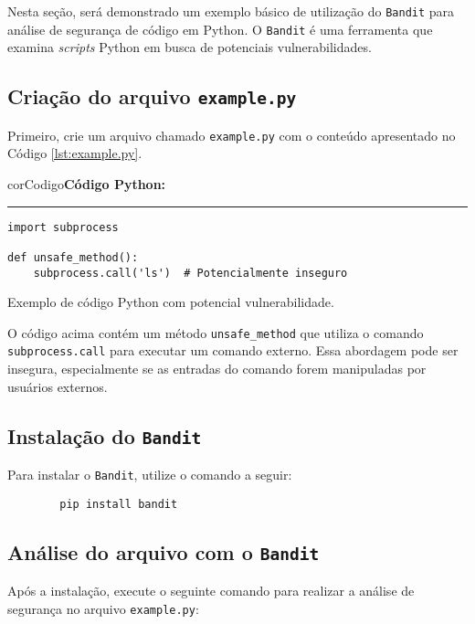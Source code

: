 Nesta seção, será demonstrado um exemplo básico de utilização do \texttt{Bandit} para análise de segurança de código em Python. O \texttt{Bandit} é uma ferramenta que examina \textit{scripts} Python em busca de potenciais vulnerabilidades.

\subsection{Criação do arquivo \texttt{example.py}}

Primeiro, crie um arquivo chamado \texttt{example.py} com o conteúdo apresentado no Código \ref{lst:example.py}.

\begin{listing}[!ht]
    \begin{myboxCode}{corCodigo}{\textbf{Código Python: }}\vspace{3mm}
    \hrule
    \begin{verbatim}
import subprocess

def unsafe_method():
    subprocess.call('ls')  # Potencialmente inseguro
\end{verbatim}
\end{myboxCode}
\caption{Exemplo de código Python com potencial vulnerabilidade.}
\label{lst:example.py}
\end{listing}

O código acima contém um método \texttt{unsafe\_method} que utiliza o comando \texttt{subprocess.call} para executar um comando externo. Essa abordagem pode ser insegura, especialmente se as entradas do comando forem manipuladas por usuários externos.

\subsection{Instalação do \texttt{Bandit}}

Para instalar o \texttt{Bandit}, utilize o comando a seguir:

\begin{verbatim}
        pip install bandit
\end{verbatim}

\subsection{Análise do arquivo com o \texttt{Bandit}}

Após a instalação, execute o seguinte comando para realizar a análise de segurança no arquivo \texttt{example.py}:

